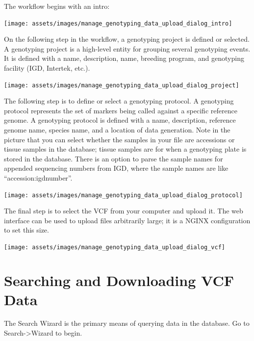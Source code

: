 \documentclass[
  12pt,
]{book}
\begin{document}
The workflow begins with an intro:

\begin{center}\texttt{[image: assets/images/manage\_genotyping\_data\_upload\_dialog\_intro]} \end{center}

On the following step in the workflow, a genotyping project is defined or selected. A genotyping project is a high-level entity for grouping several genotyping events. It is defined with a name, description, name, breeding program, and genotyping facility (IGD, Intertek, etc.).

\begin{center}\texttt{[image: assets/images/manage\_genotyping\_data\_upload\_dialog\_project]} \end{center}

The following step is to define or select a genotyping protocol. A genotyping protocol represents the set of markers being called against a specific reference genome. A genotyping protocol is defined with a name, description, reference genome name, species name, and a location of data generation. Note in the picture that you can select whether the samples in your file are accessions or tissue samples in the database; tissue samples are for when a genotyping plate is stored in the database. There is an option to parse the sample names for appended sequencing numbers from IGD, where the sample names are like ``accession:igdnumber''.

\begin{center}\texttt{[image: assets/images/manage\_genotyping\_data\_upload\_dialog\_protocol]} \end{center}

The final step is to select the VCF from your computer and upload it. The web interface can be used to upload files arbitrarily large; it is a NGINX configuration to set this size.

\begin{center}\texttt{[image: assets/images/manage\_genotyping\_data\_upload\_dialog\_vcf]} \end{center}

\hypertarget{searching-and-downloading-vcf-data}{%
\section{Searching and Downloading VCF Data}\label{searching-and-downloading-vcf-data}}

The Search Wizard is the primary means of querying data in the database. Go to Search-\textgreater Wizard to begin.
\end{document}
